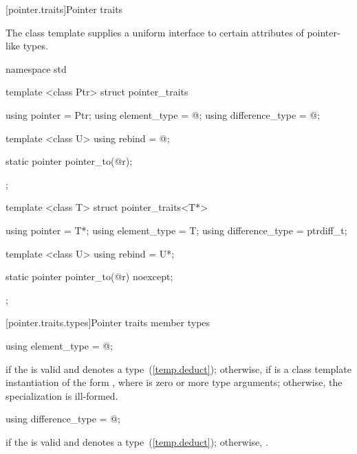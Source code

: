 [pointer.traits]{Pointer traits}

\pnum
The class template  supplies a uniform interface to certain
attributes of pointer-like types.

%
\begin{codeblock}
namespace std {
  template <class Ptr> struct pointer_traits {
    using pointer         = Ptr;
    using element_type    = @\seebelow@;
    using difference_type = @\seebelow@;

    template <class U> using rebind = @\seebelow@;

    static pointer pointer_to(@\seebelow@ r);
  };

  template <class T> struct pointer_traits<T*> {
    using pointer         = T*;
    using element_type    = T;
    using difference_type = ptrdiff_t;

    template <class U> using rebind = U*;

    static pointer pointer_to(@\seebelow@ r) noexcept;
  };
}
\end{codeblock}

[pointer.traits.types]{Pointer traits member types}

%
\begin{itemdecl}
using element_type = @\seebelow@;
\end{itemdecl}

\begin{itemdescr}
\pnum
\ctype {} if
the   is valid and denotes a
type~(\ref{temp.deduct}); otherwise,  if
 is a class template instantiation of the form ,
where  is zero or more type arguments; otherwise, the specialization is
ill-formed.
\end{itemdescr}

%
\begin{itemdecl}
using difference_type = @\seebelow@;
\end{itemdecl}

\begin{itemdescr}
\pnum
\ctype {} if
the   is valid and denotes a
type~(\ref{temp.deduct}); otherwise,
.
\end{itemdescr}

